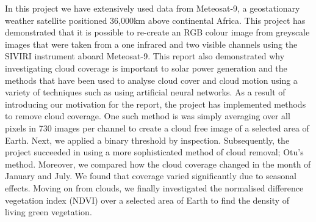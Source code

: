In this project we have extensively used data from Meteosat-9, a geostationary weather satellite positioned 36,000km above continental Africa. This project has demonstrated that it is possible to re-create an RGB colour image from greyscale images that were taken from a one infrared and two visible channels using the SIVIRI instrument aboard Meteosat-9. This report also demonstrated why investigating cloud coverage is important to solar power generation and the methods that have been used to analyse cloud cover and cloud motion using a variety of techniques such as using artificial neural networks. As a result of introducing our motivation for the report, the project has implemented methods to remove cloud coverage. One such method is was simply averaging over all pixels in 730 images per channel to create a cloud free image of a selected area of Earth. Next, we applied a binary threshold by inspection. Subsequently, the project succeeded in using a more sophisticated method of cloud removal; Otu's method. Moreover, we compared how the cloud coverage changed in the month of January and July. We found that coverage varied significantly due to seasonal effects. Moving on from clouds, we finally investigated the normalised difference vegetation index (NDVI) over a selected area of Earth to find the density of living green vegetation. 



